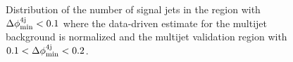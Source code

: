 \begin{figure}[h!]
\centering 
{}
\caption{Distribution of the number of signal jets in  the region with $\Delta\phi_{\rm{min}}^{4{\rm{j}}} < 0.1$ where the data-driven estimate for the multijet background is normalized and  the multijet validation region with $0.1 < \Delta\phi_{\rm{min}}^{4{\rm{j}}} < 0.2$.}\label{fig:jet_smear_jetn}
\end{figure} 


